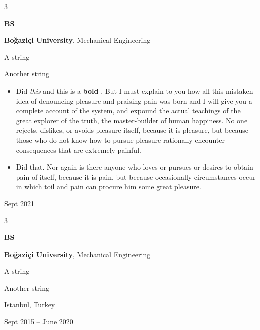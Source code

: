 \documentclass[10pt, letterpaper]{article}
\newenvironment{summary}{
    \begin{description}[
        topsep=0.10 cm,
        parsep=0.10 cm,
        partopsep=0pt,
        itemsep=0pt,
        leftmargin=0.4 cm + 10pt
    ]
}{
    \end{description}
} %
\newenvironment{highlights}{
    \begin{itemize}[
        topsep=0.10 cm,
        parsep=0.10 cm,
        partopsep=0pt,
        itemsep=0pt,
        leftmargin=0.4 cm + 10pt
    ]
}{
    \end{itemize}
} %
\newenvironment{threecolentry}[3][]{
    \onecolentry
    \def\thirdColumn{#3}
    \setcolumnwidth{1 cm, \fill, 4.5 cm}
    \begin{paracol}{3}
    {\raggedright #2} \switchcolumn
}{
    \switchcolumn \raggedleft \thirdColumn
    \end{paracol}
    \endonecolentry
} %
\let\hrefWithoutArrow\href
\renewcommand{\href}[2]{\hrefWithoutArrow{#1}{\ifthenelse{\equal{#2}{}}{ }{#2 }\raisebox{.15ex}{\footnotesize \faExternalLink*}}}
\begin{document}
        \vspace{0.2 cm}

        \begin{threecolentry}{\textbf{BS}}{
            Sept 2021
        }
            \textbf{Boğaziçi University}, Mechanical Engineering
            \begin{summary}
                \item A string
                \item Another string
            \end{summary}
            \begin{highlights}
                \item Did \textit{this} and this is a \textbf{bold} \href{https://example.com}{link}. But I must explain to you how all this mistaken idea of denouncing pleasure and praising pain was born and I will give you a complete account of the system, and expound the actual teachings of the great explorer of the truth, the master-builder of human happiness. No one rejects, dislikes, or avoids pleasure itself, because it is pleasure, but because those who do not know how to pursue pleasure rationally encounter consequences that are extremely painful.
                \item Did that. Nor again is there anyone who loves or pursues or desires to obtain pain of itself, because it is pain, but because occasionally circumstances occur in which toil and pain can procure him some great pleasure.
            \end{highlights}
        \end{threecolentry}

        \vspace{0.2 cm}

        \begin{threecolentry}{\textbf{BS}}{
            Istanbul, Turkey

        Sept 2015 – June 2020
        }
            \textbf{Boğaziçi University}, Mechanical Engineering
            \begin{summary}
                \item A string
                \item Another string
            \end{summary}
        \end{threecolentry}

        \vspace{0.2 cm}
\end{document}
